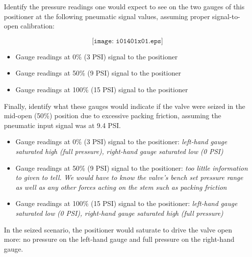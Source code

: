 

Identify the pressure readings one would expect to see on the two gauges of this positioner at the following pneumatic signal values, assuming proper signal-to-open calibration:

$$\texttt{[image: i01401x01.eps]}$$

\begin{itemize}
\item{} Gauge readings at 0\% (3 PSI) signal to the positioner
\item{} Gauge readings at 50\% (9 PSI) signal to the positioner
\item{} Gauge readings at 100\% (15 PSI) signal to the positioner
\end{itemize}

Finally, identify what these gauges would indicate if the valve were seized in the mid-open (50\%) position due to excessive packing friction, assuming the pneumatic input signal was at 9.4 PSI.







\begin{itemize}
\item{} Gauge readings at 0\% (3 PSI) signal to the positioner: {\it left-hand gauge saturated high (full pressure), right-hand gauge saturated low (0 PSI)}
\item{} Gauge readings at 50\% (9 PSI) signal to the positioner: {\it too little information to given to tell.  We would have to know the valve's bench set pressure range as well as any other forces acting on the stem such as packing friction}
\item{} Gauge readings at 100\% (15 PSI) signal to the positioner: {\it left-hand gauge saturated low (0 PSI), right-hand gauge saturated high (full pressure)}
\end{itemize}







In the seized scenario, the positioner would saturate to drive the valve open more: no pressure on the left-hand gauge and full pressure on the right-hand gauge.

